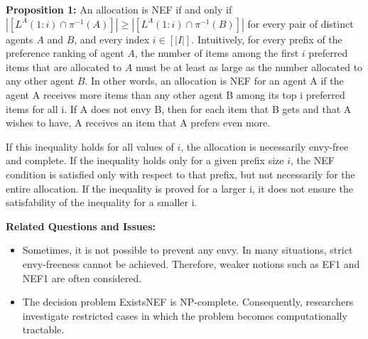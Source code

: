 \documentclass[12pt,a4paper]{article}
\begin{document}
\textbf{Proposition 1:} 
An allocation is NEF if and only if $|[ L^{A}(1:i) \cap \pi^{-1}(A) ]| \geq |[ L^{A}(1:i) \cap \pi^{-1}(B) ]|$ for every pair of distinct agents $A$ and $B$, and every index $i \in [|I|]$.
Intuitively, for every prefix of the preference ranking of agent $A$, the number of items among the first $i$ preferred items that are allocated to $A$ must be at least as large as the number allocated to any other agent $B$. 
In other words, an allocation is NEF for an agent A if the agent A receives more items than any other agent B among its top i preferred items for all i. 
If A does not envy B, then for each item that B gets and that A wishes to have, A receives an item that A prefers even more. 

If this inequality holds for all values of $i$, the allocation is necessarily envy-free and complete. 
If the inequality holds only for a given prefix size $i$, the NEF condition is satisfied only with respect to that prefix, but not necessarily for the entire allocation.
If the inequality is proved for a larger i, it does not ensure the satisfability of the inequality for a smaller i. 

\textbf{Related Questions and Issues:}
\begin{itemize}
    \item Sometimes, it is not possible to prevent any envy. 
In many situations, strict envy-freeness cannot be achieved.  
Therefore, weaker notions such as EF1 and NEF1 are often considered.
    \item The decision problem ExistsNEF is NP-complete.  
Consequently, researchers investigate restricted cases in which the problem becomes computationally tractable.
\end{itemize}
\end{document}
